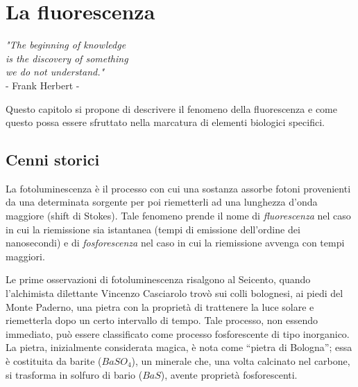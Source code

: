 \clearpage{\pagestyle{empty}\cleardoublepage}

\chapter{La fluorescenza}

\begin{flushright}\begin{small}\textit{"The beginning of knowledge\\
 is the discovery of something\\ we do not understand."}\\
- Frank Herbert -\\
\end{small}\end{flushright}

Questo capitolo si propone di descrivere il fenomeno della fluorescenza e come questo possa essere sfruttato nella marcatura di elementi biologici specifici.


\section{Cenni storici}

La fotoluminescenza è il processo con cui una sostanza assorbe fotoni provenienti da una determinata sorgente per poi riemetterli ad una lunghezza d'onda maggiore (shift di Stokes). 
Tale fenomeno prende il nome di \textit{fluorescenza} nel caso in cui la riemissione sia istantanea (tempi di emissione dell'ordine dei nanosecondi) e di \textit{fosforescenza} nel caso in cui la riemissione avvenga con tempi maggiori. 

Le prime osservazioni di fotoluminescenza risalgono al Seicento, quando l'alchimista dilettante Vincenzo Casciarolo trovò sui colli bolognesi, ai piedi del Monte Paderno, una pietra con la proprietà di trattenere la luce solare e riemetterla dopo un certo intervallo di tempo. 
Tale processo, non essendo immediato, può essere classificato come processo fosforescente di tipo inorganico. 
La pietra, inizialmente considerata magica, è nota come ``pietra di Bologna''; essa è costituita da barite ($BaSO_4$), un minerale che, una volta calcinato nel carbone, si trasforma in solfuro di bario ($BaS$), avente proprietà fosforescenti. 

